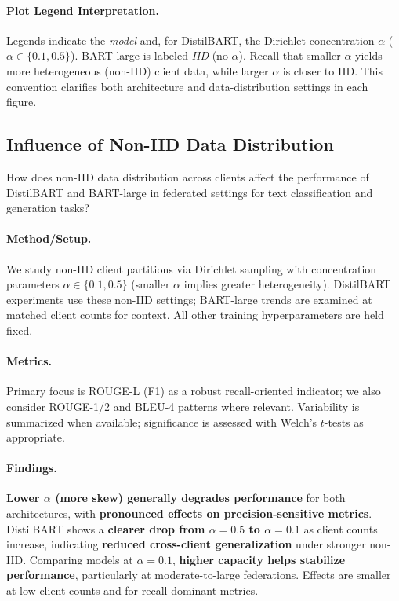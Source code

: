 \documentclass[conference]{IEEEtran}
\begin{document}
\paragraph{Plot Legend Interpretation.} Legends indicate the \textit{model} and, for DistilBART, the Dirichlet concentration $\alpha$ ($\alpha\in\{0.1, 0.5\}$). BART-large is labeled \textit{IID} (no $\alpha$). Recall that smaller $\alpha$ yields more heterogeneous (non-IID) client data, while larger $\alpha$ is closer to IID. This convention clarifies both architecture and data-distribution settings in each figure.

\subsection{Influence of Non-IID Data Distribution}\label{sec:rq3}
How does non-IID data distribution across clients affect the performance of DistilBART and BART-large in federated settings for text classification and generation tasks?

\paragraph{Method/Setup.} We study non-IID client partitions via Dirichlet sampling with concentration parameters $\alpha\in\{0.1, 0.5\}$ (smaller $\alpha$ implies greater heterogeneity). DistilBART experiments use these non-IID settings; BART-large trends are examined at matched client counts for context. All other training hyperparameters are held fixed.

\paragraph{Metrics.} Primary focus is ROUGE-L (F1) as a robust recall-oriented indicator; we also consider ROUGE-1/2 and BLEU-4 patterns where relevant. Variability is summarized when available; significance is assessed with Welch's $t$-tests as appropriate.

\paragraph{Findings.} \textbf{Lower $\alpha$ (more skew) generally degrades performance} for both architectures, with \textbf{pronounced effects on precision-sensitive metrics}. DistilBART shows a \textbf{clearer drop from $\alpha{=}0.5$ to $\alpha{=}0.1$} as client counts increase, indicating \textbf{reduced cross-client generalization} under stronger non-IID. Comparing models at $\alpha{=}0.1$, \textbf{higher capacity helps stabilize performance}, particularly at moderate-to-large federations. Effects are smaller at low client counts and for recall-dominant metrics.
\end{document}
